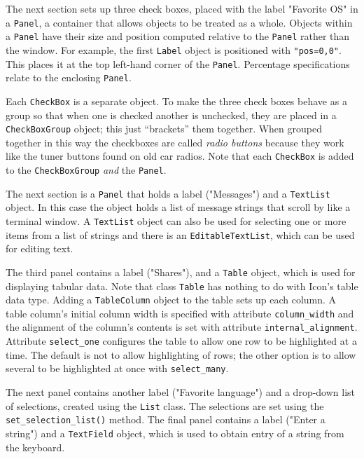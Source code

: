 The next section sets up three check boxes,
placed with the label "Favorite OS" in a \texttt{Panel},
a container that allows objects to be treated
as a whole. Objects within a \texttt{Panel} have their size and
position computed relative
to the \texttt{Panel} rather than the window. For example, the
first \texttt{Label} object is positioned with
\texttt{"pos=0,0"}. This places it at the
top left-hand corner of the \texttt{Panel}.
Percentage specifications relate to the enclosing \texttt{Panel}.

Each \texttt{CheckBox} is a separate object. To make the three check
boxes behave as a group so that when one is checked
another is unchecked, they are placed in a
\texttt{CheckBoxGroup} object; this just
``brackets'' them together. When grouped
together in this way the checkboxes are called \textit{radio buttons} because they work like the
tuner buttons found on old car radios. Note that each
\texttt{CheckBox} is added to the \texttt{CheckBoxGroup} \textit{and}
the \texttt{Panel}.

The next section is a \texttt{Panel} that holds a label
("Messages") and a \texttt{TextList}
object. In this case the object holds a list of message
strings that scroll by like a terminal window. A \texttt{TextList}
object can also be used for selecting one or more items from a list of
strings and there is an \texttt{EditableTextList},
which can be used for editing text.

The third panel contains a label ("Shares"),
and a \texttt{Table} object, which is used for displaying tabular data.
Note that class \texttt{Table} has nothing to do with
Icon's table data type. Adding a \texttt{TableColumn}
object to the table sets up each column. A table column's
initial column width is specified with attribute \texttt{column\_width}
and the alignment of the column's contents is set with
attribute \texttt{internal\_alignment}. Attribute
\texttt{select\_one} configures the table to allow one row to
be highlighted at a time. The default is not to allow highlighting of
rows; the other option is to allow several to be highlighted at once
with \texttt{select\_many}.

The next panel contains another label ("Favorite
language") and a drop-down list of selections, created
using the \texttt{List} class. The selections are set using the
\texttt{set\_selection\_list()} method. The final panel contains a
label ("Enter a string") and a
\texttt{TextField} object, which is used to obtain entry of a string
from the keyboard.

